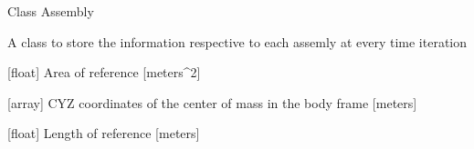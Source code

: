 \documentclass[letterpaper,10pt,english]{sphinxmanual}
\begin{document}

\begin{fulllineitems}
\label{\detokenize{modules:assembly.Assembly}}
\pysigstartsignatures
{}
\pysigstopsignatures
\sphinxAtStartPar
Class Assembly

\sphinxAtStartPar
A class to store the information respective to each assemly at every time iteration

\begin{fulllineitems}
\label{\detokenize{modules:assembly.Assembly.Aref}}
\pysigstartsignatures
{}
\pysigstopsignatures
\sphinxAtStartPar
{[}float{]} Area of reference {[}meters\textasciicircum{}2{]}

\end{fulllineitems}


\begin{fulllineitems}
\label{\detokenize{modules:assembly.Assembly.COG}}
\pysigstartsignatures
{}
\pysigstopsignatures
\sphinxAtStartPar
{[}array{]} CYZ coordinates of the center of mass in the body frame {[}meters{]}

\end{fulllineitems}


\begin{fulllineitems}
\label{\detokenize{modules:assembly.Assembly.Lref}}
\pysigstartsignatures
{}
\pysigstopsignatures
\sphinxAtStartPar
{[}float{]} Length of reference {[}meters{]}

\end{fulllineitems}


\end{fulllineitems}
\end{document}
